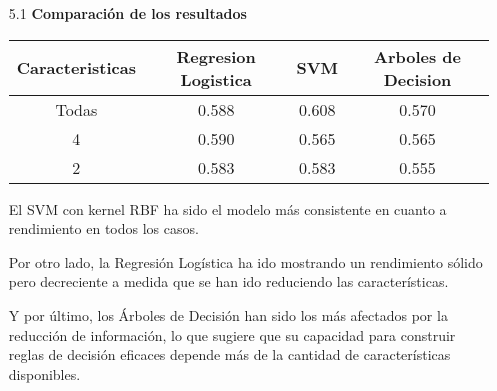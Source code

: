 \documentclass{article}
\begin{document}
\bigskip

\begin{itemize}

\item[5.1]  {\bf Comparaci\'on de los resultados}

\begin{table}[h]
  \begin{center}
    \begin{tabular}{| c | c | c | c | }
      \hline
      Caracteristicas & Regresion Logistica & SVM & Arboles de Decision \\ \hline
      Todas & 0.588 & 0.608 & 0.570 \\
      4     & 0.590 & 0.565 & 0.565 \\
      2     & 0.583 & 0.583 & 0.555 \\ \hline
    \end{tabular}
  \end{center}
\end{table}

El SVM con kernel RBF ha sido el modelo m\'as consistente en cuanto a rendimiento en todos los casos. 

Por otro lado, la Regresi\'on Log\'istica ha ido mostrando un rendimiento s\'olido pero decreciente a medida que se han ido reduciendo las caracter\'isticas. 

Y por \'ultimo, los \'Arboles de Decisi\'on han sido los m\'as afectados por la reducci\'on de informaci\'on, lo que sugiere que su capacidad para construir reglas de decisi\'on eficaces depende m\'as de la cantidad de caracter\'isticas disponibles.

\end{itemize}

\bigskip
\end{document}
